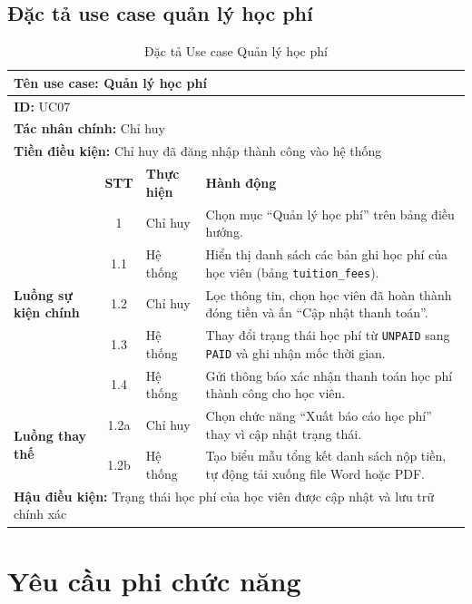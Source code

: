 \documentclass[../DoAn.tex]{subfiles}
\begin{document}
\subsection{Đặc tả use case quản lý học phí}
\hfill
\begin{table}[H]
\centering
\small
\renewcommand{\arraystretch}{1.2}
\begin{tabular}{|p{2.2cm}|c|p{2cm}|p{8.5cm}|}
\hline
\multicolumn{4}{|l|}{\textbf{Tên use case:} Quản lý học phí} \\ \hline
\multicolumn{4}{|l|}{\textbf{ID:} UC07} \\ \hline
\multicolumn{4}{|l|}{\textbf{Tác nhân chính:} Chỉ huy} \\ \hline
\multicolumn{4}{|l|}{\textbf{Tiền điều kiện:} Chỉ huy đã đăng nhập thành công vào hệ thống} \\ \hline
 & \textbf{STT} & \textbf{Thực hiện} & \textbf{Hành động} \\ \hline
\multirow{5}{2.2cm}{\textbf{Luồng sự kiện chính}} 
& 1 & Chỉ huy & Chọn mục ``Quản lý học phí'' trên bảng điều hướng. \\ \cline{2-4}
& 1.1 & Hệ thống & Hiển thị danh sách các bản ghi học phí của học viên (bảng \texttt{tuition\_fees}). \\ \cline{2-4}
& 1.2 & Chỉ huy & Lọc thông tin, chọn học viên đã hoàn thành đóng tiền và ấn ``Cập nhật thanh toán''. \\ \cline{2-4}
& 1.3 & Hệ thống & Thay đổi trạng thái học phí từ \texttt{UNPAID} sang \texttt{PAID} và ghi nhận mốc thời gian. \\ \cline{2-4}
& 1.4 & Hệ thống & Gửi thông báo xác nhận thanh toán học phí thành công cho học viên. \\ \hline
\multirow{2}{2.2cm}{\textbf{Luồng thay thế}} 
& 1.2a & Chỉ huy & Chọn chức năng ``Xuất báo cáo học phí'' thay vì cập nhật trạng thái. \\ \cline{2-4}
& 1.2b & Hệ thống & Tạo biểu mẫu tổng kết danh sách nộp tiền, tự động tải xuống file Word hoặc PDF. \\ \hline
\multicolumn{4}{|l|}{\textbf{Hậu điều kiện:} Trạng thái học phí của học viên được cập nhật và lưu trữ chính xác} \\ \hline
\end{tabular}
\caption{Đặc tả Use case Quản lý học phí}
\label{table:uc_manage_tuition}
\end{table}



\section{Yêu cầu phi chức năng}
\label{section:2.4}
\end{document}
